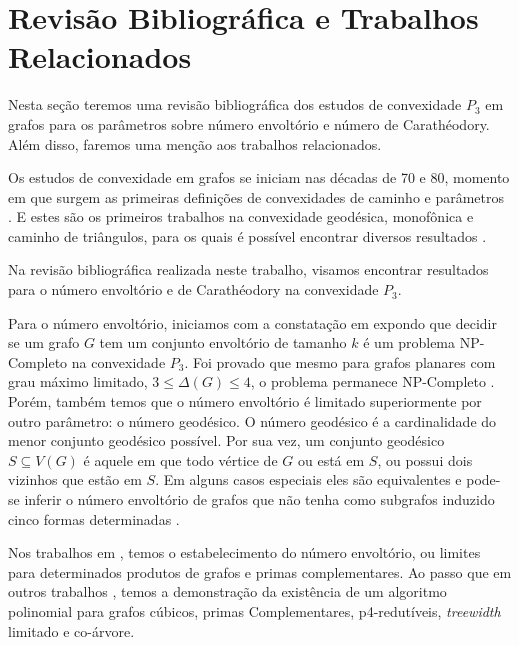 \section{Revisão Bibliográfica e Trabalhos Relacionados}

Nesta seção teremos uma revisão bibliográfica dos estudos de convexidade $P_3$ em grafos para os parâmetros sobre número envoltório e número de Carathéodory. 
Além disso, faremos uma menção aos trabalhos relacionados.

Os estudos  de convexidade em grafos se iniciam nas décadas de 70 e 80, momento em que surgem as primeiras definições de convexidades de caminho e parâmetros \cite{Harary1981,Nieminen1981,Pfaltz1971,Varlet1976}. 
E estes são os primeiros trabalhos na convexidade geodésica, 
monofônica e caminho de triângulos, para os quais é possível encontrar diversos resultados \cite{Araujo2011,Dourado2009,Dourado2013,Hernando2005,Journal2010,Nourine2012}.


Na revisão bibliográfica realizada neste trabalho, visamos encontrar resultados para o número envoltório e de Carathéodory na convexidade $P_3$.

Para o número envoltório, iniciamos com a constatação em \cite{Centeno2011} expondo que decidir se um grafo $G$ tem um conjunto envoltório de tamanho $k$ é um problema NP-Completo na convexidade $P_3$.
Foi provado que mesmo para grafos planares com grau máximo limitado,
$3 \le \Delta(G) \le 4$, o problema permanece NP-Completo \cite{Penso2015}.
Porém, também temos que o número envoltório é limitado superiormente por outro parâmetro:
o número geodésico. O número geodésico é a cardinalidade do menor conjunto geodésico possível.
Por sua vez, um conjunto geodésico $S \subseteq V(G)$ é aquele em que todo vértice de $G$ 
ou está em $S$, ou possui dois vizinhos que estão em $S$. Em alguns casos especiais eles são equivalentes e pode-se inferir o número envoltório de grafos que não tenha como subgrafos induzido cinco formas determinadas \cite{Centeno}. 


Nos trabalhos em \cite{Balogh,Bollobas,duarte2015complexity,De2016a}, temos 
o estabelecimento do número envoltório, ou limites 
para determinados produtos de grafos e primas complementares. 
Ao passo que em outros trabalhos \cite{DraquePenso2014,duarte2015complexity,Hon2016},
temos a demonstração da existência de um algoritmo polinomial
para grafos cúbicos, primas Complementares, p4-redutíveis, \textit{treewidth} limitado e co-árvore.



